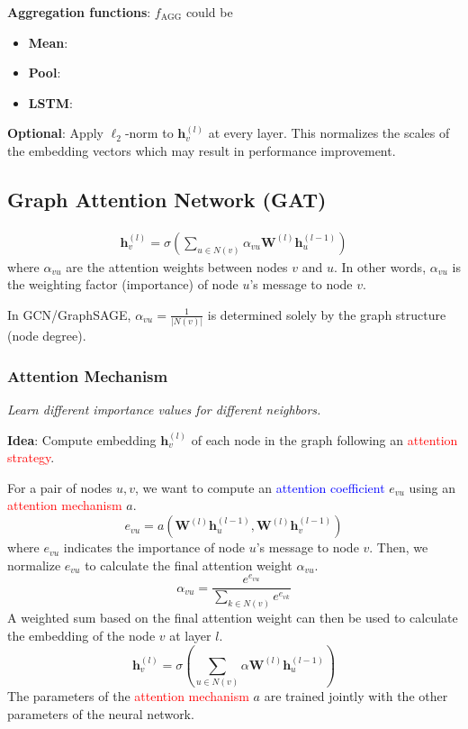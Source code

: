 \documentclass[12pt]{article}
\newcommand{\tbf}{\textbf}
\newcommand{\tit}{\textit}
\newcommand{\tcR}{\textcolor{red}}
\newcommand{\tcB}{\textcolor{blue}}
\newcommand{\mbf}{\mathbf}
\begin{document}
\tbf{Aggregation functions}: $f_{\text{AGG}}$ could be
\begin{itemize}
  \itemsep0em
  \item \tbf{Mean}:
  \item \tbf{Pool}:
  \item \tbf{LSTM}:
\end{itemize}

\tbf{Optional}: Apply $\ell_2$-norm to $\mbf{h}_v^{(l)}$ at every layer. This
normalizes the scales of the embedding vectors which may result in performance
improvement.

\subsection*{Graph Attention Network (GAT)}

\begin{align*}
  \mbf{h}_v^{(l)} = \sigma\left(\sum_{u \in N(v)} \alpha_{vu}
  \mbf{W}^{(l)}\mbf{h}_u^{(l-1)}\right)
\end{align*}
where $\alpha_{vu}$ are the attention weights between nodes $v$ and $u$. In
other words, $\alpha_{vu}$ is the weighting factor
(importance) of node $u$'s message to node $v$.

\smallskip
In GCN/GraphSAGE, $\alpha_{vu} = \frac{1}{|N(v)|}$ is determined solely by the
graph structure (node degree).

\subsubsection*{Attention Mechanism} 

\tit{Learn different importance values for different neighbors.}

\medskip
\tbf{Idea}: Compute embedding $\mbf{h}_v^{(l)}$ of each node in the graph
following an \tcR{attention strategy}.

\medskip
For a pair of nodes $u,v$, we want to compute an \tcB{attention coefficient}
$e_{vu}$ using an \tcR{attention mechanism} $a$.
\[
  e_{vu} = a(\mbf{W}^{(l)}\mbf{h}_u^{(l-1)},\mbf{W}^{(l)}\mbf{h}_v^{(l-1)})
\]
where $e_{vu}$ indicates the importance of node $u$'s message to node $v$. Then,
we normalize $e_{vu}$ to calculate the final attention weight $\alpha_{vu}$.
\[
  \alpha_{vu} = \frac{e^{e_{vu}}}{\sum_{k \in N(v)} e^{e_{vk}}}
\]
A weighted sum based on the final attention weight can then be used to calculate
the embedding of the node $v$ at layer $l$.
\[
  \mbf{h}_v^{(l)} = \sigma(\sum_{u \in N(v)} \alpha
  \mbf{W}^{(l)}\mbf{h}_u^{(l-1)})
\]
The parameters of the \tcR{attention mechanism} $a$ are trained jointly with the
other parameters of the neural network.
\end{document}
